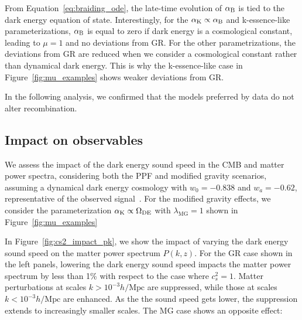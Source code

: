 \documentclass[%
reprint,
superscriptaddress,
preprint numbers,
nofootinbib,
amsmath,amssymb,
aps,
prd
]{revtex4-2}
\begin{document}
From Equation~\ref{eq:braiding_ode}, the late-time evolution of $\alpha_{\rm B}$ is tied to the dark energy equation of state. Interestingly, for the $\alpha_{\rm K} \propto \alpha_{\rm B}$ and k-essence-like parameterizations, $\alpha_{\rm B}$ is equal to zero if dark energy is a cosmological constant, leading to $\mu = 1$ and no deviations from GR. For the other parametrizations, the deviations from GR are reduced when we consider a cosmological constant rather than dynamical dark energy. This is why the k-essence-like case in Figure~\ref{fig:mu_examples} shows weaker deviations from GR.

 In the following analysis, we confirmed that the models preferred by data do not alter recombination. 

\subsection{Impact on observables}
We assess the impact of the dark energy sound speed in the CMB and matter power spectra, considering both the PPF and modified gravity scenarios, assuming a dynamical dark energy cosmology with $w_0 = -0.838$ and $w_a = -0.62$, representative of the observed signal~\cite{desi_dr2_bao}. For the modified gravity effects, we consider the parameterization $\alpha_{\rm K} \propto \Omega_\mathrm{DE}$ with $\lambda_\mathrm{MG} = 1$ shown in Figure~\ref{fig:mu_examples}

In Figure~\ref{fig:cs2_impact_pk}, we show the impact of varying the dark energy sound speed on the matter power spectrum $P(k, z)$. For the GR case shown in the left panels, lowering the dark energy sound speed impacts the matter power spectrum by less than 1\% with respect to the case where $c_s^2 = 1$. Matter perturbations at scales $k > 10^{-3} h/\mathrm{Mpc}$ are suppressed, while those at scales $k < 10^{-3} h/\mathrm{Mpc}$ are enhanced. As the the sound speed gets lower, the suppression extends to increasingly smaller scales. The MG case shows an opposite effect:  
\end{document}
